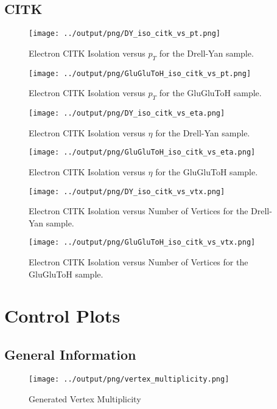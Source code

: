 \documentclass[11pt]{book}
\begin{document}
\section{CITK}

\begin{figure}[htb]
\centering
\texttt{[image: ../output/png/DY\_iso\_citk\_vs\_pt.png]}
\caption{Electron CITK Isolation versus $p_{T}$ for the Drell-Yan sample.}
\label{fig:dy_iso_citk_vs_pt}
\end{figure}

\begin{figure}[htb]
\centering
\texttt{[image: ../output/png/GluGluToH\_iso\_citk\_vs\_pt.png]}
\caption{Electron CITK Isolation versus $p_{T}$ for the GluGluToH sample.}
\label{fig:ggh_iso_citk_vs_pt}
\end{figure}

\begin{figure}[htb]
\centering
\texttt{[image: ../output/png/DY\_iso\_citk\_vs\_eta.png]}
\caption{Electron CITK Isolation versus $\eta$ for the Drell-Yan sample.}
\label{fig:dy_iso_citk_vs_eta}
\end{figure}

\begin{figure}[htb]
\centering
\texttt{[image: ../output/png/GluGluToH\_iso\_citk\_vs\_eta.png]}
\caption{Electron CITK Isolation versus $\eta$ for the GluGluToH sample.}
\label{fig:ggh_iso_citk_vs_eta}
\end{figure}

\begin{figure}[htb]
\centering
\texttt{[image: ../output/png/DY\_iso\_citk\_vs\_vtx.png]}
\caption{Electron CITK Isolation versus Number of Vertices for the Drell-Yan sample.}
\label{fig:dy_iso_citk_vs_vtx}
\end{figure}

\begin{figure}[htb]
\centering
\texttt{[image: ../output/png/GluGluToH\_iso\_citk\_vs\_vtx.png]}
\caption{Electron CITK Isolation versus Number of Vertices for the GluGluToH sample.}
\label{fig:ggh_iso_citk_vs_vtx}
\end{figure}
\clearpage

\chapter{Control Plots}
\section{General Information}
\begin{figure}[htb]
\centering
\texttt{[image: ../output/png/vertex\_multiplicity.png]}
\caption{Generated Vertex Multiplicity}
\label{fig:vertex_multiplicity}
\end{figure}
\end{document}
